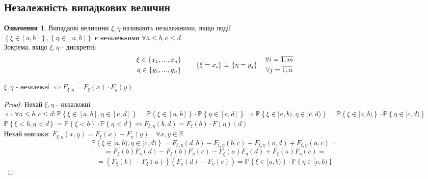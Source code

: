 \documentclass[14pt,a4paper]{scrartcl}
\theoremstyle{definition}
\newtheorem*{defo}{Означення}
\theoremstyle{remark}
\theoremstyle{definition}
\theoremstyle{definition}
\newcommand\independent{\protect\mathpalette{\protect\independenT}{\perp}}
\def\independenT#1#2{\mathrel{\rlap{$#1#2$}\mkern2mu{#1#2}}}
\begin{document}
\subsection{Незалежність випадкових величин}
\begin{defo}
	Випадкові величини $\xi, \eta$ називають незалежними, якщо події \\$ \left\lbrace \xi\in [a,b] \right\rbrace, \left\lbrace \eta\in [a,b] \right\rbrace $ є незалежними $ \forall a \leq  b , c\leq d$\\
	Зокрема, якщо $\xi, \eta$ - дискретні:
	$$
	\begin{gathered}
	 \xi \in \left\lbrace x_1, ..., x_n \right\rbrace\\
	 \eta \in \left\lbrace y_1, ..., y_n  \right\rbrace
	\end{gathered} \qquad \left\lbrace \xi = x_i \right\rbrace \independent \left\lbrace \eta = y_j \right\rbrace \quad \begin{gathered}
	 \forall i = \overline{1, m}\\
	 \forall j = \overline{1, n}
	\end{gathered}
	$$

\end{defo}

\pagebreak

\begin{boxteo}
	$\xi, \eta$ - незалежні $\Leftrightarrow F_{\xi, \eta} = F_{\xi}(x) \cdot F_{\eta}(y)$
\end{boxteo}
\begin{proof}
Нехай $\xi, \eta$ - незалежні $\Leftrightarrow \forall a\leq b, c\leq d: \mathbb{P} \left\lbrace  \xi \in [a,b], \eta \in [c,d] \right\rbrace = \mathbb{P} \left\lbrace \xi\in[a,b] \right\rbrace \cdot \mathbb{P} \left\lbrace \eta\in[c,d] \right\rbrace \Rightarrow \mathbb{P} \left\lbrace  \xi\in [a,b), \eta \in [c,d) \right\rbrace = \mathbb{P} \left\lbrace \xi \in [a,b) \right\rbrace \cdot \mathbb{P} \left\lbrace \eta \in [c,d) \right\rbrace  $\\
$
\mathbb{P} \left\lbrace \xi<b, \eta <d  \right\rbrace = \mathbb{P} \left\lbrace \xi < b \right\rbrace \cdot \mathbb{P} \left\lbrace \eta <d \right\rbrace \Leftrightarrow F_{\xi, \eta} (b,d) = F_{\xi}(b) \cdot F(\eta)(d)
$\\
Нехай навпаки: $ F_{\xi, \eta } (x,y)  = F_{\xi}(x) - F_{\eta}(y)\quad \forall x,y \in \mathbb{R}$
$$
\mathbb{P} \left\lbrace  \xi\in [a,b), \eta \in [c,d)\right\rbrace = F_{\xi, \eta} (d,b) - F_{\xi,\eta}(b,c) - F_{\xi, \eta }(a,d) + F_{\xi, \eta}(a,c) =
$$
$$
= F_{\xi}(b) F_{\eta} (d) - F_{\xi}(b) F_{\eta}(c) - F_{\xi}(a) F_{\eta}(d) + F_{\xi}(a) F_{\eta}(c)  =$$
$$= \left( F_{\xi}(b) - F_{\xi}(a) \right) \left( F_{\eta}(d) - F_\eta (c) \right) = \mathbb{P} \left\lbrace \xi\in [a,b) \right\rbrace \cdot \mathbb{P} \left\lbrace \eta \in [c,b) \right\rbrace
$$

\end{proof}

\end{document}
